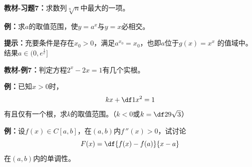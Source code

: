{\bf 教材-习题7：}求数列$\sqrt[n]n$中最大的一项。

\begin{center}
\end{center}

{\bf 例：}求$a$的取值范围，使$y=a^x$与$y=x$必相交。

{\bf 提示：}充要条件是存在$x_0>0$，满足$a^{x_0}=x_0$，也即$a$位于$g(x)=x^{x}$
的值域中。结果$a\in(0,e^{\frac1e}]$

{\bf 教材-例7：}判定方程$2^x-2x=1$有几个实根。

\begin{center}
\end{center}

{\bf 例：}已知$x>0$时，
$$kx+\df1{x^2}=1$$
有且仅有一个根，求$k$的取值范围。（$k<0$或$k=\df29\sqrt 3$）

{\bf 例：}设$f(x)\in C[a,b]$，在$(a,b)$内$f\,''(x)>0$，试讨论
$$F(x)=\df{f(x)-f(a)}{x-a}$$
在$(a,b)$内的单调性。

